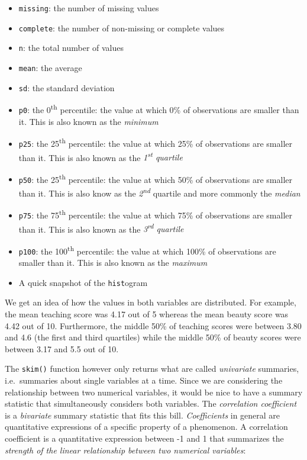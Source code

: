 \documentclass[12pt,]{krantz}
\providecommand{\tightlist}{%
  \setlength{\itemsep}{0pt}\setlength{\parskip}{0pt}}
\begin{document}
\begin{itemize}
\tightlist
\item
  \texttt{missing}: the number of missing values
\item
  \texttt{complete}: the number of non-missing or complete values
\item
  \texttt{n}: the total number of values
\item
  \texttt{mean}: the average
\item
  \texttt{sd}: the standard deviation
\item
  \texttt{p0}: the 0\textsuperscript{th} percentile: the value at which
  0\% of observations are smaller than it. This is also known as the
  \emph{minimum}
\item
  \texttt{p25}: the 25\textsuperscript{th} percentile: the value at
  which 25\% of observations are smaller than it. This is also known as
  the \emph{1\textsuperscript{st} quartile}
\item
  \texttt{p50}: the 25\textsuperscript{th} percentile: the value at
  which 50\% of observations are smaller than it. This is also know as
  the \emph{2\textsuperscript{nd}} quartile and more commonly the
  \emph{median}
\item
  \texttt{p75}: the 75\textsuperscript{th} percentile: the value at
  which 75\% of observations are smaller than it. This is also known as
  the \emph{3\textsuperscript{rd} quartile}
\item
  \texttt{p100}: the 100\textsuperscript{th} percentile: the value at
  which 100\% of observations are smaller than it. This is also known as
  the \emph{maximum}
\item
  A quick snapshot of the \texttt{hist}ogram
\end{itemize}

We get an idea of how the values in both variables are distributed. For
example, the mean teaching score was 4.17 out of 5 whereas the mean
beauty score was 4.42 out of 10. Furthermore, the middle 50\% of
teaching scores were between 3.80 and 4.6 (the first and third
quartiles) while the middle 50\% of beauty scores were between 3.17 and
5.5 out of 10.

The \texttt{skim()} function however only returns what are called
\emph{univariate} summaries, i.e.~summaries about single variables at a
time. Since we are considering the relationship between two numerical
variables, it would be nice to have a summary statistic that
simultaneously considers both variables. The \emph{correlation
coefficient} is a \emph{bivariate} summary statistic that fits this
bill. \emph{Coefficients} in general are quantitative expressions of a
specific property of a phenomenon. A correlation coefficient is a
quantitative expression between -1 and 1 that summarizes the
\emph{strength of the linear relationship between two numerical
variables}:
\end{document}
